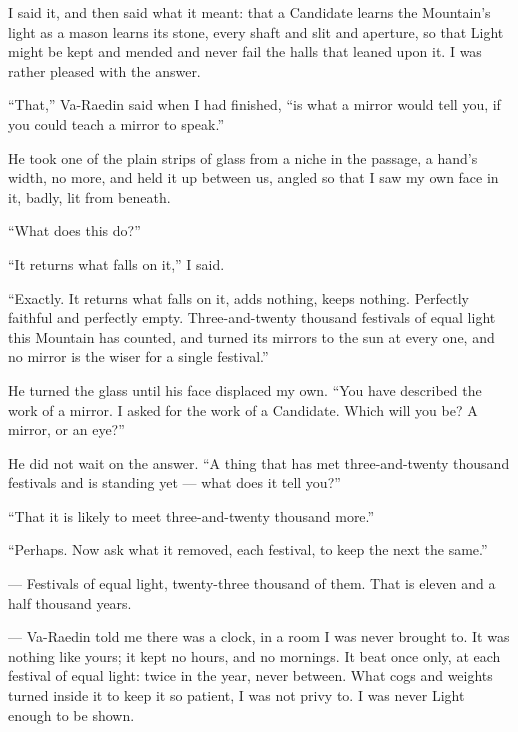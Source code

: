 I said it, and then said what it meant: that a Candidate learns the Mountain's light as a mason learns its stone, every shaft and slit and aperture, so that Light might be kept and mended and never fail the halls that leaned upon it. I was rather pleased with the answer.\par

``That,'' Va-Raedin said when I had finished, ``is what a mirror would tell you, if you could teach a mirror to speak.''\par

He took one of the plain strips of glass from a niche in the passage, a hand's width, no more, and held it up between us, angled so that I saw my own face in it, badly, lit from beneath.\par

``What does this do?''\par
``It returns what falls on it,'' I said.\par
``Exactly. It returns what falls on it, adds nothing, keeps nothing. Perfectly faithful and perfectly empty. Three-and-twenty thousand festivals of equal light this Mountain has counted, and turned its mirrors to the sun at every one, and no mirror is the wiser for a single festival.''\par

He turned the glass until his face displaced my own. ``You have described the work of a mirror. I asked for the work of a Candidate. Which will you be? A mirror, or an eye?''\par

He did not wait on the answer. ``A thing that has met three-and-twenty thousand festivals and is standing yet --- what does it tell you?''\par

``That it is likely to meet three-and-twenty thousand more.''\par

``Perhaps. Now ask what it removed, each festival, to keep the next the same.''\par

\begin{room}

--- Festivals of equal light, twenty-three thousand of them. That is eleven and a half thousand years. 

--- Va-Raedin told me there was a clock, in a room I was never brought to. It was nothing like yours; it kept no hours, and no mornings. It beat once only, at each festival of equal light: twice in the year, never between. What cogs and weights turned inside it to keep it so patient, I was not privy to. I was never Light enough to be shown.

\end{room}


